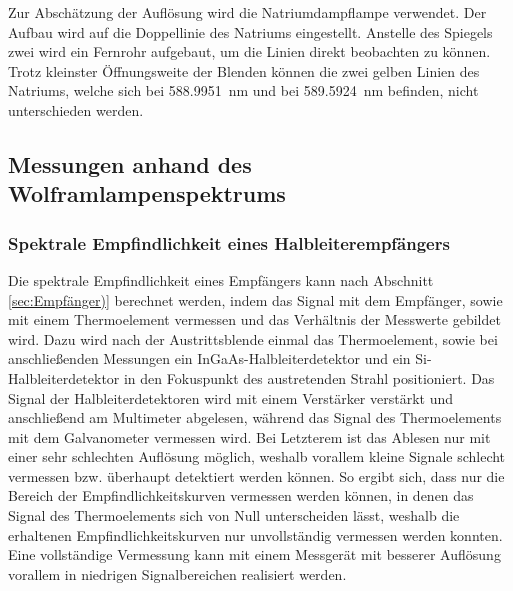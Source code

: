 \documentclass[a4paper,twoside,final]{article}
\begin{document}


Zur Abschätzung der Auflösung wird die Natriumdampflampe verwendet. Der Aufbau wird auf die Doppellinie des Natriums eingestellt. Anstelle des Spiegels zwei wird ein Fernrohr aufgebaut, um die Linien direkt beobachten zu können. Trotz kleinster Öffnungsweite der Blenden können die zwei gelben Linien des Natriums, welche sich bei \SI{588.9951}{\nano\meter} und bei \SI{589.5924}{\nano\meter} befinden, nicht unterschieden werden.

\subsection{Messungen anhand des Wolframlampenspektrums}
\subsubsection{Spektrale Empfindlichkeit eines Halbleiterempfängers}
Die spektrale Empfindlichkeit eines Empfängers kann nach Abschnitt \ref{sec:Empfänger)} berechnet werden, indem das Signal mit dem Empfänger, sowie mit einem Thermoelement vermessen  und das Verhältnis der Messwerte gebildet wird. Dazu wird nach der Austrittsblende einmal das Thermoelement, sowie bei anschließenden Messungen ein InGaAs-Halbleiterdetektor und ein Si-Halbleiterdetektor in den Fokuspunkt des austretenden Strahl positioniert. Das Signal der Halbleiterdetektoren wird mit einem Verstärker verstärkt und anschließend am Multimeter abgelesen, während das Signal des Thermoelements mit dem Galvanometer vermessen wird. Bei Letzterem ist das Ablesen nur mit einer sehr schlechten Auflösung möglich, weshalb vorallem kleine Signale schlecht vermessen bzw. überhaupt detektiert werden können. So ergibt sich, dass nur die Bereich der Empfindlichkeitskurven vermessen werden können, in denen das Signal des Thermoelements sich von Null unterscheiden lässt, weshalb die erhaltenen Empfindlichkeitskurven nur unvollständig vermessen werden konnten. Eine vollständige Vermessung kann mit einem Messgerät mit besserer Auflösung vorallem in niedrigen Signalbereichen realisiert werden.




\end{document}
